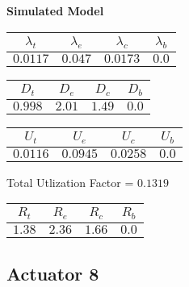 \documentclass{article}
\begin{document}
\begin{minipage}{0.5\textwidth}
\centering	\textbf{Simulated Model}
\begin{table}[H]
\centering
\begin{tabular}{@{}cccc@{}}
\toprule
$\lambda_t$ & $\lambda_e$ & $\lambda_c$ & $\lambda_b$\\
\midrule
$0.0117$ & $0.047$ & $0.0173$ & $0.0$\\
\bottomrule
\end{tabular}
\end{table}
\begin{table}[H]
\centering
\begin{tabular}{@{}cccc@{}}
\toprule
$D_t$ & $D_e$ & $D_c$ & $D_b$\\
\midrule
$0.998$ & $2.01$ & $1.49$ & $0.0$\\
\bottomrule
\end{tabular}
\end{table}\begin{table}[H]
\centering
\begin{tabular}{@{}cccc@{}}
\toprule
$U_t$ & $U_e$ & $U_c$ & $U_b$\\
\midrule
$0.0116$ & $0.0945$ & $0.0258$ & $0.0$\\
\bottomrule
\end{tabular}
\end{table}
\centering Total Utlization Factor = $0.1319$
\begin{table}[H]
\centering
\begin{tabular}{@{}cccc@{}}
\toprule
$R_t$ & $R_e$ & $R_c$ & $R_b$\\
\midrule
$1.38$ & $2.36$ & $1.66$ & $0.0$\\
\bottomrule
\end{tabular}
\end{table}
\end{minipage}\subsection{Actuator 8}
\end{document}
